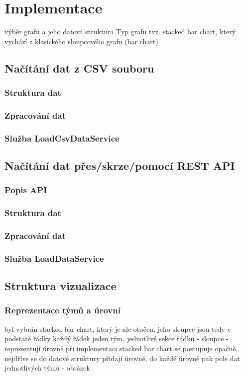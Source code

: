 \documentclass[
  digital, %
  oneside, %
  table,   %
  nolof,     %
  nolot,     %
]{fithesis3}
\begin{document}
\chapter{Implementace}
výběr grafu a jeho datová struktura
Typ grafu tvz. stacked bar chart, který vychází z klasického sloupcového grafu (bar chart)

\section{Načítání dat z CSV souboru}
\subsection{Struktura dat}
\subsection{Zpracování dat}
\subsection{Služba LoadCsvDataService}

\section{Načítání dat přes/skrze/pomocí REST API}
\subsection{Popis API}
\subsection{Struktura dat}
\subsection{Zpracování dat}
\subsection{Služba LoadDataService}

\section{Struktura vizualizace}
\subsection{Reprezentace týmů a úrovní}
byl vybrán stacked bar chart, který je ale otočen, jeho sloupce jsou tedy v podstatě řádky
každý řádek jeden tým, jednotlivé sekce řádku - sloupce - reprezentují úrovně
při implementaci stacked bar chart se postupuje opačně, nejdříve se do datové struktury přidají úrovně, do každé úrovně pak pole dat jednotlivých týmů - obrázek
\end{document}
